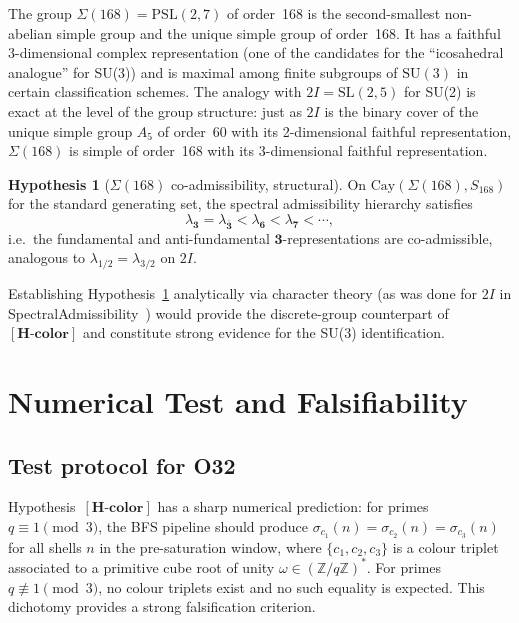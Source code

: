 \documentclass[11pt,a4paper]{article}
\theoremstyle{definition}
\newtheorem{hypothesis}[theorem]{Hypothesis}
\theoremstyle{remark}
\newcommand{\SU}{\mathrm{SU}}
\newcommand{\Hcolor}{\mathbf{[H\text{-}color]}}
\newcommand{\Z}{\mathbb{Z}}
\begin{document}
      The group $\Sigma(168) = \mathrm{PSL}(2,7)$ of order~168 is the second-smallest non-abelian
      simple group and the unique simple group of order~168.
      It has a faithful 3-dimensional complex representation (one of the candidates for the
      ``icosahedral analogue'' for SU(3)) and is maximal among finite subgroups of $\SU(3)$ in
      certain classification schemes.
      The analogy with $2I = \mathrm{SL}(2,5)$ for SU(2) is exact at the level of the group
      structure: just as $2I$ is the binary cover of the unique simple group $A_5$ of order~60
      with its 2-dimensional faithful representation, $\Sigma(168)$ is simple of order~168 with its
      3-dimensional faithful representation.

      \begin{hypothesis}[$\Sigma(168)$ co-admissibility, structural]
        \label{hyp:sigma168}
        On $\mathrm{Cay}(\Sigma(168), S_{168})$ for the standard generating set, the spectral
        admissibility hierarchy satisfies
        \begin{equation}
          \lambda_{\mathbf{3}} = \lambda_{\bar{\mathbf{3}}} < \lambda_{\mathbf{6}} < \lambda_{\mathbf{7}} < \cdots,
        \end{equation}
        i.e.\ the fundamental and anti-fundamental $\mathbf{3}$-representations are co-admissible,
        analogous to $\lambda_{1/2} = \lambda_{3/2}$ on $2I$.
      \end{hypothesis}

      Establishing Hypothesis~\ref{hyp:sigma168} analytically via character theory (as was done for
      $2I$ in SpectralAdmissibility~\cite{Beau2026a1}) would provide the discrete-group counterpart
      of $\Hcolor$ and constitute strong evidence for the SU(3) identification.

  \section{Numerical Test and Falsifiability}
    \label{sec:numerical-test}

    \subsection{Test protocol for O32}
      \label{ssec:protocol}

      Hypothesis~$\Hcolor$ has a sharp numerical prediction: for primes $q \equiv 1 \pmod{3}$,
      the BFS pipeline should produce $\sigma_{c_1}(n) = \sigma_{c_2}(n) = \sigma_{c_3}(n)$
      for all shells $n$ in the pre-saturation window, where $\{c_1, c_2, c_3\}$ is a colour triplet
      associated to a primitive cube root of unity $\omega \in (\Z/q\Z)^*$.
      For primes $q \not\equiv 1 \pmod{3}$, no colour triplets exist and no such equality is expected.
      This dichotomy provides a strong falsification criterion.
\end{document}

